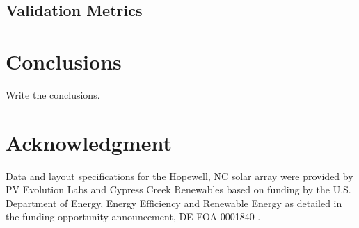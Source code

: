 \documentclass[conference]{IEEEtran}
\begin{document}
\subsection{Validation Metrics}

\section{Conclusions}
Write the conclusions.

\section*{Acknowledgment}

Data and layout specifications for the Hopewell, NC solar array were provided by PV Evolution Labs and Cypress Creek Renewables based on funding by the U.S. Department of Energy, Energy Efficiency and Renewable Energy as detailed in the funding opportunity announcement, DE-FOA-0001840 \cite{CypressCreekRenewables2019}.



\end{document}
